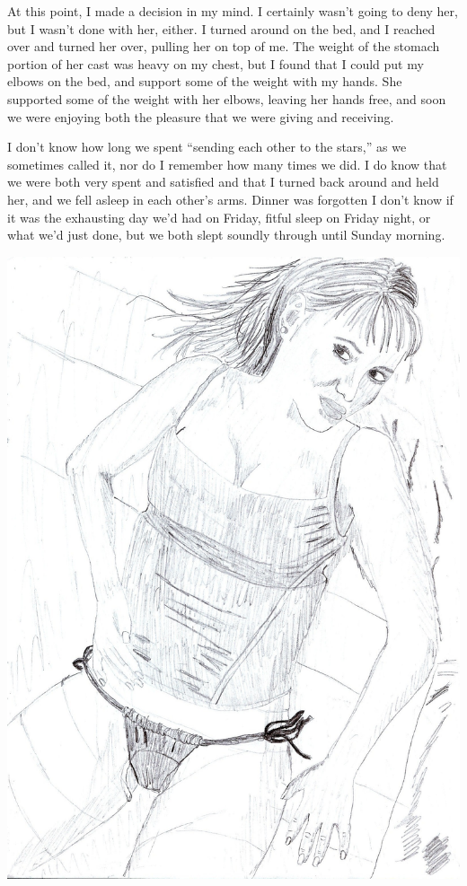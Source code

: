 At this point, I made a decision in my mind. I certainly wasn't going to deny her, but I
wasn't done with her, either. I turned around on the bed, and I reached over and turned her
over, pulling her on top of me. The weight of the stomach portion of her cast was heavy on my
chest, but I found that I could put my elbows on the bed, and support some of the weight with my
hands. She supported some of the weight with her elbows, leaving her hands free, and soon we
were enjoying both the pleasure that we were giving and receiving.

I don't know how long we spent ``sending each other to the stars,'' as we sometimes called
it, nor do I remember how many times we did. I do know that we were both very spent and
satisfied and that I turned back around and held her, and we fell asleep in each other's arms.
Dinner was forgotten I don't know if it was the exhausting day we'd had on Friday, fitful sleep
on Friday night, or what we'd just done, but we both slept soundly through until Sunday
morning.

\newpage
\begin{center}
\includegraphics[width=\textwidth]{images/kicks42.jpg}
\end{center}
